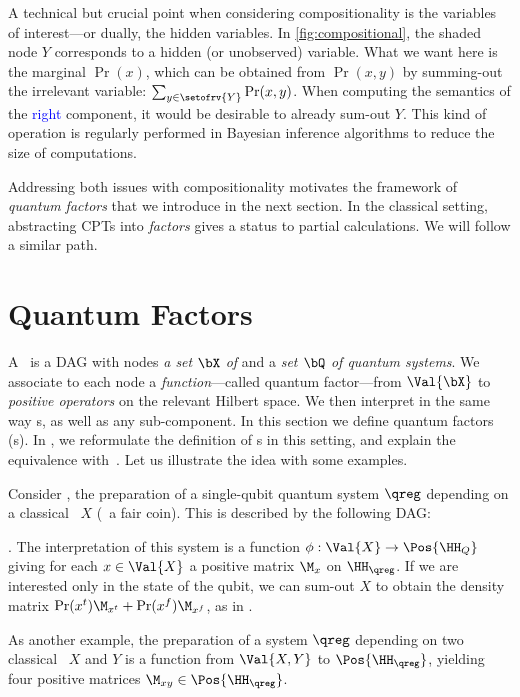 \begin{remark}
\label{rem:marginals}
A technical but crucial point when considering compositionality is the variables of interest---or dually, the hidden variables.
In \cref{fig:compositional}, the shaded node $Y$ corresponds to a hidden (or unobserved) variable.
What we want here is the marginal $\Pr(x)$, which can be obtained from $\Pr(x,y)$ by summing-out the irrelevant variable: $\sum_{y \in \setofrv{Y}} \Pr(x,y)$.
When computing the semantics of the \textcolor{blue}{right} component, it would be desirable to already sum-out $Y$.
This kind of operation is regularly performed in Bayesian inference algorithms to reduce the size of computations.
\end{remark}

Addressing both issues with compositionality motivates the framework of \emph{quantum factors} that we introduce in the next section.
In the classical setting, abstracting CPTs into \emph{factors} gives a status to partial calculations. We will follow a similar path.


\section{Quantum Factors}
\label{sec:semantic}

A \QBN\ is a DAG with nodes \emph{a set $\bX$ of \rvs} and a \emph{set $\bQ$ of quantum systems}.
We associate to each node a \emph{function}---called quantum factor---from $\Val{\bX}$ to \emph{positive operators} on the relevant Hilbert space.
We then interpret in the same way \QBN s, as well as any sub-component.
In this section we define quantum factors (\Qfactor s).
In , we reformulate the definition of \QBN s in this setting, and explain the equivalence with~\cite{GBN2014}.
Let us illustrate the idea with some examples.

\begin{example}
Consider , the preparation of a single-qubit quantum system $\qreg$ depending on a classical \rv\ $X$ (\eg\ a fair coin).
This is described by the following DAG:
.
The interpretation of this system is a function $\phi: \Val{X} \to \Pos{\HH_Q}$ giving for each $x \in \Val{X}$ a positive matrix $\M_{x}$ on $\HH_\qreg$.
If we are interested only in the state of the qubit, we can sum-out $X$ to obtain the density matrix $\Pr(x^t) \M_{x^t}+ \Pr(x^f) \M_{x^f}$, as in .

As another example, the preparation of a system $\qreg$ depending on two classical \rvs\ $X$ and $Y$ is a function from $\Val{X,Y}$ to $\Pos{\HH_\qreg}$, yielding four positive matrices $\M_{xy}\in\Pos{\HH_\qreg}$.
\end{example}

